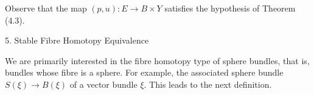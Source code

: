 Observe that the map $(p, u): E \rightarrow B \times Y$ satisfies the hypothesis of Theorem (4.3).

5. Stable Fibre Homotopy Equivalence

We are primarily interested in the fibre homotopy type of sphere bundles, that is, bundles whose fibre is a sphere. For example, the associated sphere bundle $S(\xi) \rightarrow B(\xi)$ of a vector bundle $\xi$. This leads to the next definition.

